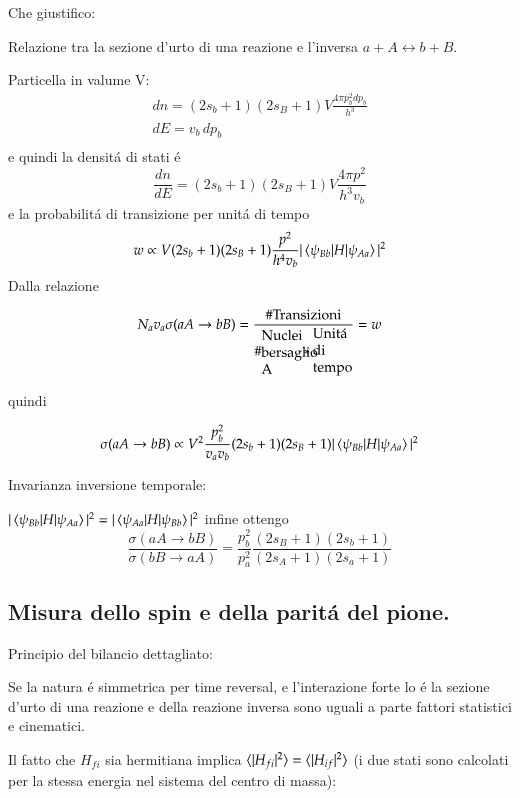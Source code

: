 \documentclass[main.tex]{subfiles}
\begin{document}
Che giustifico: 


Relazione tra la sezione d'urto di una reazione e l'inversa
$a+A\leftrightarrow b+B$.

Particella in valume V:
\begin{align*}
dn=(2s_b+1)(2s_B+1)V\frac{4\pi p_b^2dp_b}{h^3}\\
dE=v_b\,dp_b\\
\end{align*}
e quindi la densit\'a di stati \'e
\begin{equation*}
\frac{dn}{dE}=(2s_b+1)(2s_B+1)V\frac{4\pi p^2}{h^3v_b}
\end{equation*}
e la probabilit\'a di transizione per unit\'a di tempo
\begin{equation*}
w\propto V(2s_b+1)(2s_B+1)\frac{p^2}{h^4v_b}|\braket{\psi_{Bb}|H|\psi_{Aa}}|^2
\end{equation*}
Dalla relazione

\begin{equation*}
N_av_a\sigma(aA\rightarrow bB)=\frac{\# \text{Transizioni}}{\# \parbox{1cm}{Nuclei bersaglio A}*\parbox{1cm}{Unit\'a di tempo}}=w
\end{equation*}

quindi

\begin{equation*}
\sigma(aA\rightarrow bB)\propto V^2\frac{p_b^2}{v_av_b}(2s_b+1)(2s_B+1)|\braket{\psi_{Bb}|H|\psi_{Aa}}|^2
\end{equation*}

Invarianza inversione temporale:

$|\braket{\psi_{Bb}|H|\psi_{Aa}}|^2=|\braket{\psi_{Aa}|H|\psi_{Bb}}|^2$ 
infine ottengo
\begin{equation*}
\frac{\sigma(aA\rightarrow bB)}{\sigma(bB\rightarrow aA)}=\frac{p_b^2}{p_a^2}\frac{(2s_B+1)(2s_b+1)}{(2s_A+1)(2s_a+1)}
\end{equation*}

\subsection{Misura dello spin e della parit\'a del pione.}

Principio del bilancio dettagliato:

Se la natura \'e simmetrica per time reversal, e l'interazione forte lo \'e la sezione d'urto di una reazione e della reazione inversa sono uguali a parte fattori statistici e cinematici.

Il fatto che $H_{fi}$ sia hermitiana implica $\langle |H_{fi}|^2 \rangle=\langle |H_{if}|^2 \rangle$ (i due stati sono calcolati per la stessa energia nel sistema del centro di massa):
\end{document}

